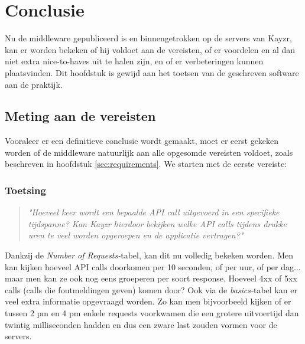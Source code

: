 
\chapter{Conclusie}
\label{ch:conclusie}


Nu de middleware gepubliceerd is en binnengetrokken op de servers van Kayzr, kan er worden bekeken of hij voldoet aan de vereisten, of er voordelen en al dan niet extra nice-to-haves uit te halen zijn, en of er verbeteringen kunnen plaatsvinden. Dit hoofdstuk is gewijd aan het toetsen van de geschreven software aan de praktijk.

\section{Meting aan de vereisten}
\label{sec:reqs}

Vooraleer er een definitieve conclusie wordt gemaakt, moet er eerst gekeken worden of de middleware natuurlijk aan alle opgesomde vereisten voldoet, zoals beschreven in hoofdstuk \ref{sec:requirements}. We starten met de eerste vereiste:

\subsection{Toetsing}
\label{sec:testing}

\begin{quote}
	\textit{"Hoeveel keer wordt een bepaalde API call uitgevoerd in een specifieke tijdspanne? Kan Kayzr hierdoor bekijken welke API calls tijdens drukke uren te veel worden opgeroepen en de applicatie vertragen?"}
\end{quote}

Dankzij de \textit{Number of Requests-}tabel, kan dit nu volledig bekeken worden. Men kan kijken hoeveel API calls doorkomen per 10 seconden, of per uur, of per dag... maar men kan ze ook nog eens groeperen per soort response. Hoeveel 4xx of 5xx calls (calls die foutmeldingen geven) komen door? Ook via de \textit{basics-}tabel kan er veel extra informatie opgevraagd worden. Zo kan men bijvoorbeeld kijken of er tussen 2 pm en 4 pm enkele requests voorkwamen die een grotere uitvoertijd dan twintig milliseconden hadden en dus een zware last zouden vormen voor de servers.

